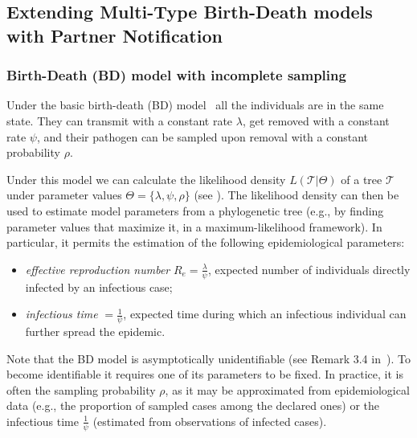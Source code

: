 \documentclass[10pt,letterpaper]{article}
\begin{document}
\subsection*{Extending Multi-Type Birth-Death models with Partner Notification}
\subsubsection*{Birth-Death (BD) model with incomplete sampling}
Under the basic birth-death (BD) model~\cite{Stadler2009} all the individuals are in the same state. They can transmit with a constant rate $\lambda$, get removed with a constant rate $\psi$, and their pathogen can be sampled upon removal with a constant probability $\rho$. 

Under this model we can calculate the likelihood density $L(\mathscr{T}|\Theta)$ of a tree $\mathscr{T}$ under parameter values $\Theta = \{\lambda, \psi, \rho\}$ (see ). The likelihood density can then be used to estimate model parameters from a phylogenetic tree (e.g., by finding parameter values that maximize it, in a maximum-likelihood framework). In particular, it permits the estimation of the following epidemiological parameters: 

\begin{itemize}
\item \textit{effective reproduction number} $R_e = \frac{\lambda}{\psi}$, expected number of individuals directly infected by an infectious case;
\item \textit{infectious time} $=\frac{1}{\psi}$, expected time during which an infectious individual can further spread the epidemic.
\end{itemize} 


Note that the BD model is asymptotically unidentifiable (see Remark 3.4 in~\cite{Stadler2009}). To become identifiable it requires one of its parameters to be fixed. In practice, it is often the sampling probability $\rho$, as it may be approximated from epidemiological data (e.g., the proportion of sampled cases among the declared ones) or the infectious time $\frac{1}{\psi}$ (estimated from observations of infected cases). 
\end{document}
